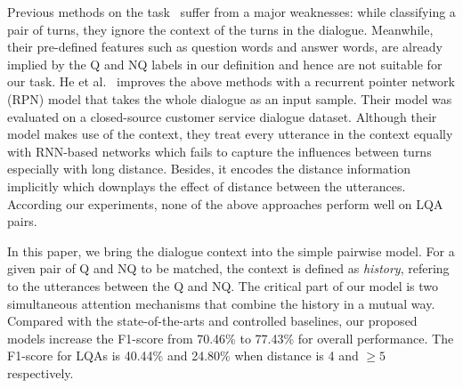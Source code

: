 Previous methods on the task~\cite{ding2008using,du2017discovering,jiang2018learning} suffer from a major weaknesses: while classifying a pair of turns, they ignore the context of the turns in the dialogue. Meanwhile, their pre-defined features such as question words and answer words, are already implied by the Q and NQ labels in our definition and hence are not suitable for our task. He et al.~ improves the above methods with a recurrent pointer network (RPN) model that takes the whole dialogue as an input sample. Their model was evaluated on a closed-source customer service dialogue dataset. Although their model makes use of the context, they treat every utterance in the context equally with RNN-based networks which fails to capture the influences between turns especially with long distance. Besides, it encodes the distance information implicitly which downplays the effect of distance between the utterances. According our experiments, none of the above approaches perform well on LQA pairs.


In this paper, we bring the dialogue context into the simple pairwise model. For a given pair of Q and NQ to be matched, the context is defined as {\em history}, refering to the utterances between the Q and NQ. The critical part of our model is two simultaneous attention mechanisms that combine the history in a mutual way. Compared with the state-of-the-arts and controlled baselines, our proposed models increase the F1-score from 70.46\% to 77.43\% for overall performance. The F1-score for LQAs is 40.44\% and 24.80\% when distance is 4 and $\geq 5$ respectively.

